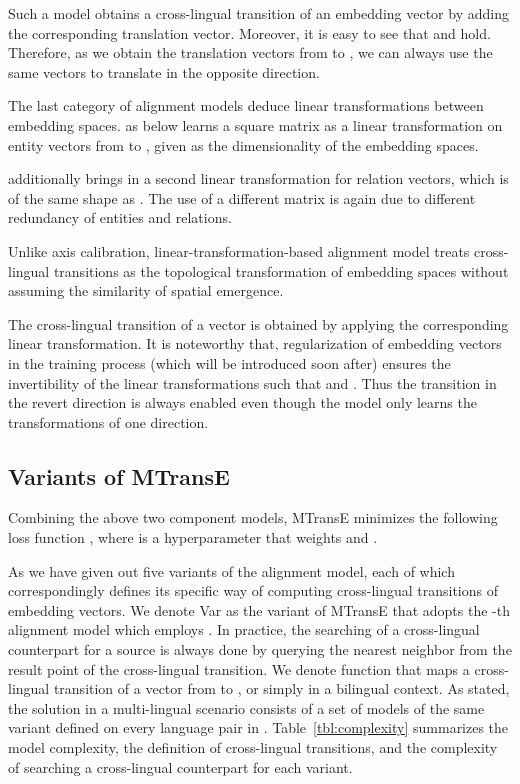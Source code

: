 \documentclass{article}
\def\inv{\vspace{-0.1cm}}
\begin{document}
Such a model obtains a cross-lingual transition of an embedding vector by adding the corresponding translation vector.
Moreover, it is easy to see that  and  hold. Therefore, as we obtain the translation vectors from  to , we can always use the same vectors to translate in the opposite direction.

The last category of alignment models deduce linear transformations between embedding spaces.  as below learns a  square matrix  as a linear transformation on entity vectors from  to , given  as the dimensionality of the embedding spaces.

 additionally brings in a second linear transformation  for relation vectors, which is of the same shape as . The use of a different matrix is again due to different redundancy of entities and relations.

Unlike axis calibration, linear-transformation-based alignment model treats cross-lingual transitions as the topological transformation of embedding spaces without assuming the similarity of spatial emergence. \par

The cross-lingual transition of a vector is obtained by applying the corresponding linear transformation. It is noteworthy that, regularization of embedding vectors in the training process (which will be introduced soon after) ensures the invertibility
of the linear transformations such that  and . Thus the transition in the revert direction is always enabled even though the model only learns the transformations of one direction.

\inv
\subsection{Variants of MTransE}

Combining the above two component models, MTransE minimizes the following loss function ,
where  is a hyperparameter that weights  and .

As we have given out five variants of the alignment model, each of which correspondingly defines its specific way of computing cross-lingual transitions of embedding vectors.
We denote Var as the variant of MTransE that adopts the -th alignment model which employs .
In practice, the searching of a cross-lingual counterpart for a source is always done by querying the nearest neighbor from the result point of the cross-lingual transition.
We denote function  that maps a cross-lingual transition of a vector from  to , or simply  in a bilingual context. As stated,
the solution in a multi-lingual scenario consists of a set of models of the same variant defined on every language pair in .
Table~\ref{tbl:complexity} summarizes the model complexity, the definition of cross-lingual transitions, and the complexity of searching a cross-lingual counterpart for each variant.
\end{document}
